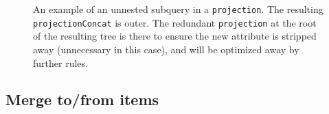 \begin{figure}[htpb]
\begin{subfigure}[c]{140pt}
    \end{subfigure}\hfill\begin{subfigure}[c]{268pt}
        \centering
    \end{subfigure}
    
    \caption{An example of an unnested subquery in a \texttt{projection}. The resulting \texttt{projectionConcat} is outer. The redundant \texttt{projection} at the root of the resulting tree is there to ensure the new attribute is stripped away (unnecessary in this case), and will be optimized away by further rules.}
    \label{fig:tree-unnest-subqueries}
\end{figure}

\subsection{Merge to/from items}

